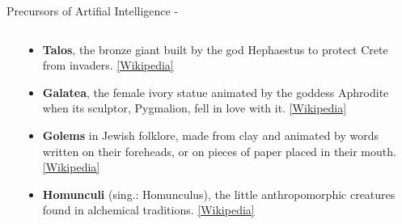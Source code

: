 \begin{frame}[t, allowframebreaks]{Precursors of Artifial Intelligence -}
\begin{columns}[t]
\begin{column}{0.46\textwidth}
\begin{center}
{          \\}
         \end{center}
        \end{column}
        \begin{column}{0.54\textwidth}
            \begin{itemize}
                \small
                \item 
                {\bf Talos}, the bronze giant built by the god
                Hephaestus to protect Crete from invaders.
                \href{https://en.wikipedia.org/wiki/Talos}{\tiny [Wikipedia]}
                \item 
                {\bf Galatea}, the female ivory statue animated 
                by the goddess Aphrodite when its sculptor, Pygmalion, 
                fell in love with it.
                \href{https://en.wikipedia.org/wiki/Pygmalion_(mythology)}{\tiny [Wikipedia]}
                \item
                {\bf Golems} in Jewish folklore, made from clay 
                and animated by words written on their foreheads, 
                or on pieces of paper placed in their mouth.
                \href{https://en.wikipedia.org/wiki/Golem}{\tiny [Wikipedia]}
                \item
                {\bf Homunculi} (sing.: Homunculus), 
                the little anthropomorphic creatures found in alchemical traditions.
                \href{https://en.wikipedia.org/wiki/Homunculus}{\tiny [Wikipedia]}
            \end{itemize}        
        \end{column}
    \end{columns}

    \framebreak


\end{frame}
